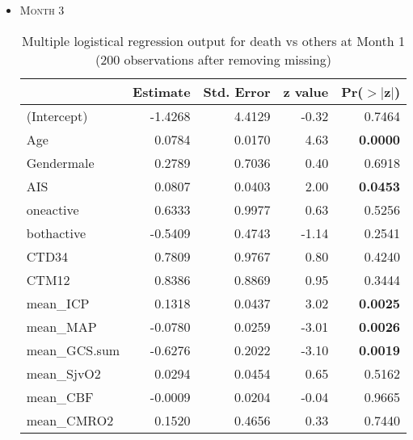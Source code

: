 \documentclass{article}
\begin{document}
\begin{itemize}
\item \textsc{Month 3}
\begin{table}[H]
\centering
\caption{Multiple logistical regression output for death vs others at Month 1 (200 observations after removing missing)}
\begin{tabular}{lrrrr}
  \hline
 & Estimate & Std. Error & z value & Pr($>$$|$z$|$) \\ 
  \hline
(Intercept) & -1.4268 & 4.4129 & -0.32 & 0.7464 \\ 
  Age & 0.0784 & 0.0170 & 4.63 & {\bf 0.0000} \\ 
  Gendermale & 0.2789 & 0.7036 & 0.40 & 0.6918 \\ 
  AIS & 0.0807 & 0.0403 & 2.00 & {\bf 0.0453} \\ 
  oneactive & 0.6333 & 0.9977 & 0.63 & 0.5256 \\ 
  bothactive & -0.5409 & 0.4743 & -1.14 & 0.2541 \\ 
  CTD34 & 0.7809 & 0.9767 & 0.80 & 0.4240 \\ 
  CTM12 & 0.8386 & 0.8869 & 0.95 & 0.3444 \\ 
  mean\_ICP & 0.1318 & 0.0437 & 3.02 & {\bf 0.0025} \\ 
  mean\_MAP & -0.0780 & 0.0259 & -3.01 & {\bf 0.0026} \\ 
  mean\_GCS.sum & -0.6276 & 0.2022 & -3.10 & {\bf 0.0019} \\ 
  mean\_SjvO2 & 0.0294 & 0.0454 & 0.65 & 0.5162 \\ 
  mean\_CBF & -0.0009 & 0.0204 & -0.04 & 0.9665 \\ 
  mean\_CMRO2 & 0.1520 & 0.4656 & 0.33 & 0.7440 \\ 
   \hline
\end{tabular}
\end{table}



\end{itemize}
\end{document}
